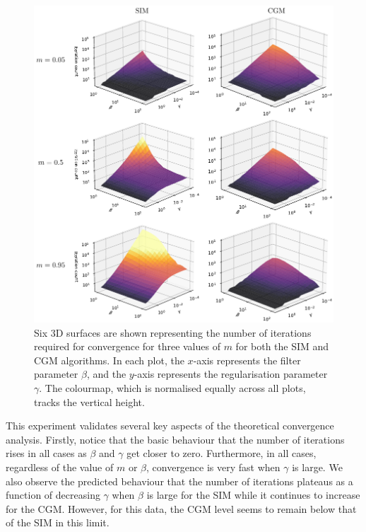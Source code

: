 \begin{figure}[t]
    \begin{center} 
    \includegraphics[width=\linewidth]{Figures/3d_iterations.pdf}
    \end{center}
    \caption[Convergence experiments]{\small{Six 3D surfaces are shown representing the number of iterations required for convergence for three values of $m$ for both the SIM and CGM algorithms. In each plot, the $x$-axis represents the filter parameter $\beta$, and the $y$-axis represents the regularisation parameter $\gamma$. The colourmap, which is normalised equally across all plots, tracks the vertical height. }}
    \label{fig:3d_iteration_plots}
\end{figure}

This experiment validates several key aspects of the theoretical convergence analysis. Firstly, notice that the basic behaviour that the number of iterations rises in all cases as $\beta$ and $\gamma$ get closer to zero. Furthermore, in all cases, regardless of the value of $m$ or $\beta$, convergence is very fast when $\gamma$ is large. We also observe the predicted behaviour that the number of iterations plateaus as a function of decreasing $\gamma$ when $\beta$ is large for the SIM while it continues to increase for the CGM. However, for this data, the CGM level seems to remain below that of the SIM in this limit. 

